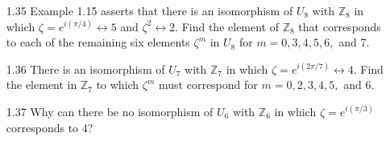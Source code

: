 \documentclass[12pt]{article}
\newcommand{\Z}{\mathds{Z}}
\begin{document}
\begin{enumerate}
	\item[1.35] Example 1.15 asserts that there is an isomorphism of $U_8$ with $\Z_8$ in which $\zeta = e^{i(\pi/4)} \leftrightarrow 5$ and $\zeta^2 \leftrightarrow 2$. Find the element of $\Z_8$ that corresponds to each of the remaining six elements $\zeta^m$ in $U_8$ for $m=0,3,4,5,6,$ and 7.
	
	\item[1.36] There is an isomorphism of $U_7$ with $\Z_7$ in which $\zeta = e^{i(2\pi/7)} \leftrightarrow 4$. Find the element in $\Z_7$ to which $\zeta^m$ must correspond for $m=0,2,3,4,5,$ and 6.
	
	\item[1.37] Why can there be no isomorphism of $U_6$ with $\Z_6$ in which $\zeta=e^{i(\pi/3)}$ corresponds to 4?
	
\end{enumerate}
\end{document}
